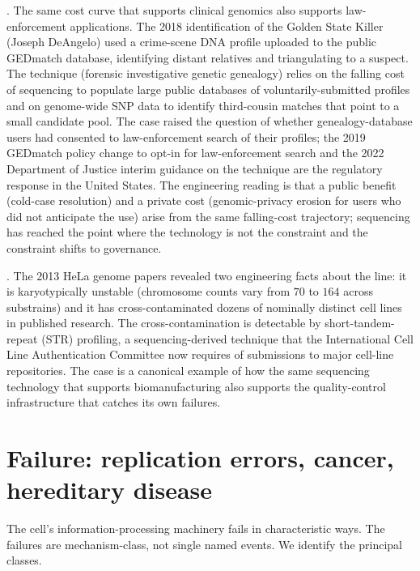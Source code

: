 . The same cost
curve that supports clinical genomics also supports law-enforcement
applications. The 2018 identification of the Golden State Killer
(Joseph DeAngelo) used a crime-scene DNA profile uploaded to the
public GEDmatch database, identifying distant relatives and triangulating
to a suspect. The technique (forensic investigative genetic genealogy)
relies on the falling cost of sequencing to populate large public
databases of voluntarily-submitted profiles and on genome-wide SNP
data to identify third-cousin matches that point to a small candidate
pool. The case raised the question of whether genealogy-database
users had consented to law-enforcement search of their profiles; the
2019 GEDmatch policy change to opt-in for law-enforcement search and
the 2022 Department of Justice interim guidance on the technique are
the regulatory response in the United States. The engineering reading
is that a public benefit (cold-case resolution) and a private cost
(genomic-privacy erosion for users who did not anticipate the use)
arise from the same falling-cost trajectory; sequencing has reached
the point where the technology is not the constraint and the
constraint shifts to governance.

. The 2013 HeLa genome papers \cite{paper:v6c03-landry-2013}
revealed two engineering facts about the line: it is karyotypically
unstable (chromosome counts vary from $70$ to $164$ across substrains)
and it has cross-contaminated dozens of nominally distinct cell lines
in published research. The cross-contamination is detectable by
short-tandem-repeat (STR) profiling, a sequencing-derived technique
that the International Cell Line Authentication Committee now requires
of submissions to major cell-line repositories. The case is a
canonical example of how the same sequencing technology that supports
biomanufacturing also supports the quality-control infrastructure
that catches its own failures.

\section{Failure: replication errors, cancer, hereditary disease}

The cell's information-processing machinery fails in characteristic
ways. The failures are mechanism-class, not single named events. We
identify the principal classes.

